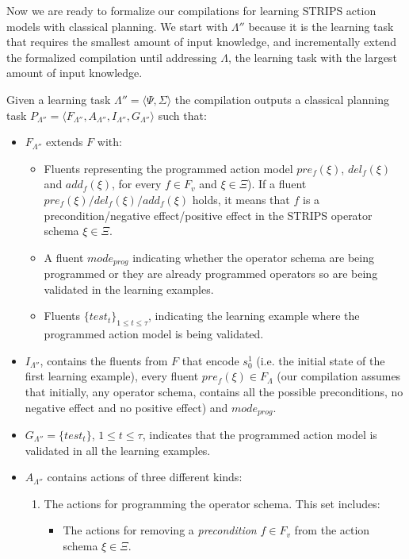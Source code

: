 \documentclass[letterpaper]{article} %
\newcommand{\tup}[1]{{\langle #1 \rangle}}
\begin{document}
Now we are ready to formalize our compilations for learning STRIPS action models with classical planning. We start with $\Lambda''$ because it is the learning task that requires the smallest amount of input knowledge, and incrementally extend the formalized compilation until addressing $\Lambda$, the learning task with the largest amount of input knowledge.

Given a learning task $\Lambda''=\tup{\Psi,\Sigma}$ the compilation outputs a classical planning task $P_{\Lambda''}=\tup{F_{\Lambda''},A_{\Lambda''},I_{\Lambda''},G_{\Lambda''}}$ such that:
\begin{itemize}
\item $F_{\Lambda''}$ extends $F$ with:
\begin{itemize}
\item Fluents representing the programmed action model $pre_f(\xi)$, $del_f(\xi)$ and $add_f(\xi)$, for every $f\in F_v$ and $\xi \in \Xi$). If a fluent $pre_f(\xi)/del_f(\xi)/add_f(\xi)$ holds, it means that $f$ is a precondition/negative effect/positive effect in the STRIPS operator schema $\xi\in \Xi$. 
\item A fluent $mode_{prog}$ indicating whether the operator schema are being programmed or they are already programmed operators so are being validated in the learning examples. 
\item Fluents $\{test_t\}_{1\leq t\leq \tau}$, indicating the learning example where the programmed action model is being validated.
\end{itemize}
\item $I_{\Lambda''}$, contains the fluents from $F$ that encode $s_0^1$ (i.e. the initial state of the first learning example), every fluent $pre_f(\xi)\in F_{\Lambda}$ (our compilation assumes that initially, any operator schema, contains all the possible preconditions, no negative effect and no positive effect) and $mode_{prog}$. 
\item $G_{\Lambda''}=\{test_t\}$, {\small $1\leq t\leq \tau$}, indicates that the programmed action model is validated in all the learning examples.
\item $A_{\Lambda''}$ contains actions of three different kinds:
\begin{enumerate}
\item The actions for programming the operator schema. This set includes:
\begin{itemize}
\item The actions for removing a {\em precondition} $f\in F_v$ from the action schema $\xi\in\Xi$.


\end{itemize}
\end{enumerate}
\end{itemize}
\end{document}
